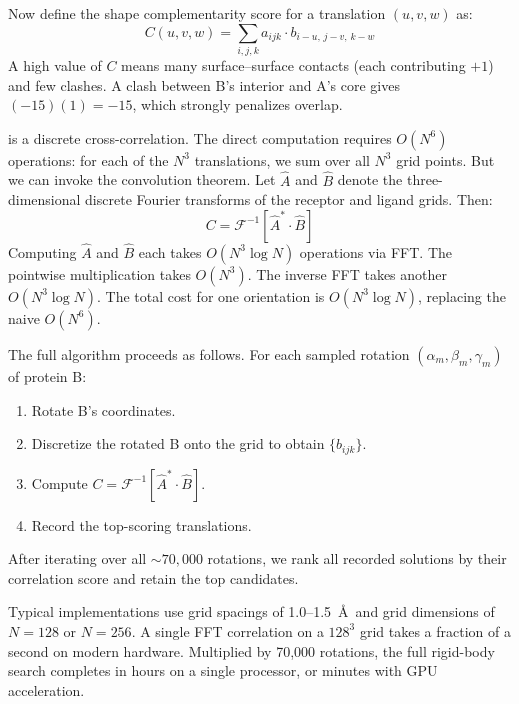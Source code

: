 Now define the shape complementarity score for a translation $(u,v,w)$ as:
\begin{equation}
\label{eq:correlation}
C(u,v,w) = \sum_{i,j,k} a_{ijk} \cdot b_{i-u,\, j-v,\, k-w}
\end{equation}
A high value of $C$ means many surface--surface contacts (each contributing $+1$) and few clashes.
A clash between B's interior and A's core gives $(-15)(1) = -15$, which strongly penalizes overlap.

 is a discrete cross-correlation.
The direct computation requires $O(N^6)$ operations: for each of the $N^3$ translations, we sum over all $N^3$ grid points.
But we can invoke the convolution theorem.
Let $\hat{A}$ and $\hat{B}$ denote the three-dimensional discrete Fourier transforms of the receptor and ligand grids.
Then:
\begin{equation}
\label{eq:fft-correlation}
C = \mathcal{F}^{-1}\!\left[\hat{A}^* \cdot \hat{B}\right]
\end{equation}
Computing $\hat{A}$ and $\hat{B}$ each takes $O(N^3 \log N)$ operations via FFT.
The pointwise multiplication takes $O(N^3)$.
The inverse FFT takes another $O(N^3 \log N)$.
The total cost for one orientation is $O(N^3 \log N)$, replacing the naive $O(N^6)$.

The full algorithm proceeds as follows.
For each sampled rotation $(\alpha_m, \beta_m, \gamma_m)$ of protein B:
\begin{enumerate}
\item Rotate B's coordinates.
\item Discretize the rotated B onto the grid to obtain $\{b_{ijk}\}$.
\item Compute $C = \mathcal{F}^{-1}[\hat{A}^* \cdot \hat{B}]$.
\item Record the top-scoring translations.
\end{enumerate}
After iterating over all $\sim 70{,}000$ rotations, we rank all recorded solutions by their correlation score and retain the top candidates.

Typical implementations use grid spacings of 1.0--1.5~\AA\ and grid dimensions of $N = 128$ or $N = 256$.
A single FFT correlation on a $128^3$ grid takes a fraction of a second on modern hardware.
Multiplied by 70,000 rotations, the full rigid-body search completes in hours on a single processor, or minutes with GPU acceleration.

